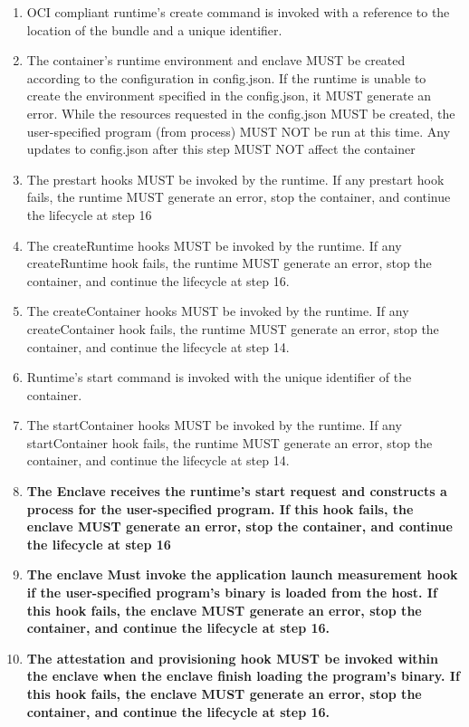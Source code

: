 \begin{enumerate}
    \item OCI compliant runtime's create command is invoked with a reference to the location of the bundle and a unique identifier.
    \item The container's runtime environment and enclave MUST be created according to the configuration in config.json. If the runtime is unable to create the environment specified in the config.json, it MUST generate an error. While the resources requested in the config.json MUST be created, the user-specified program (from process) MUST NOT be run at this time. Any updates to config.json after this step MUST NOT affect the container
    \item The prestart hooks MUST be invoked by the runtime. If any prestart hook fails, the runtime MUST generate an error, stop the container, and continue the lifecycle at step 16
    \item The createRuntime hooks MUST be invoked by the runtime. If any createRuntime hook fails, the runtime MUST generate an error, stop the container, and continue the lifecycle at step 16.
    \item The createContainer hooks MUST be invoked by the runtime. If any createContainer hook fails, the runtime MUST generate an error, stop the container, and continue the lifecycle at step 14.
    \item Runtime's start command is invoked with the unique identifier of the container.
    \item The startContainer hooks MUST be invoked by the runtime. If any startContainer hook fails, the runtime MUST generate an error, stop the container, and continue the lifecycle at step 14.
    \item \textbf{The Enclave receives the runtime’s start request and constructs a process for the user-specified program. If this hook fails, the enclave MUST generate an error, stop the container, and continue the lifecycle at step 16}
    \item \textbf{The enclave Must invoke the application launch measurement hook if the user-specified program’s binary is loaded from the host. If this hook fails, the enclave MUST generate an error, stop the container, and continue the lifecycle at step 16.}
    \item \textbf{The attestation and provisioning hook MUST be invoked within the enclave when the enclave finish loading the program’s binary. If this hook fails, the enclave MUST generate an error, stop the container, and continue the lifecycle at step 16.}

\end{enumerate}
